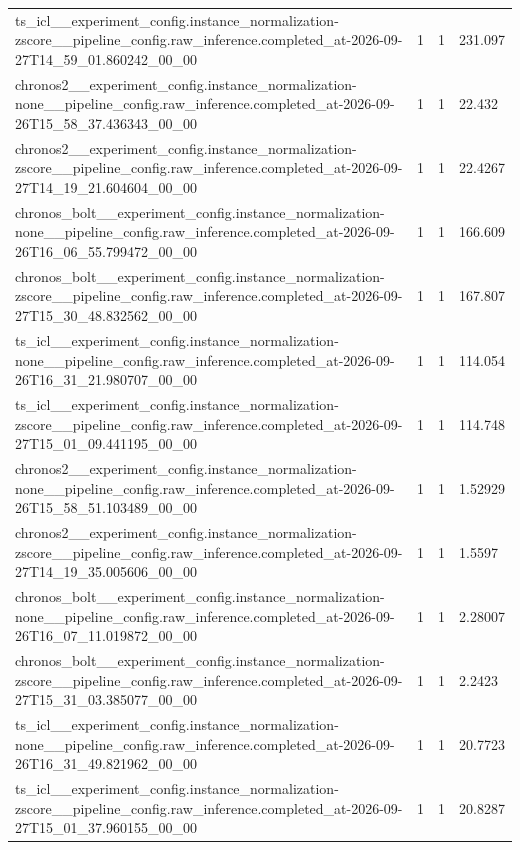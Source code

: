 \begin{tabular}{llll}
ts\_icl\_\_experiment\_config.instance\_normalization-zscore\_\_pipeline\_config.raw\_inference.completed\_at-2026-09-27T14\_59\_01.860242\_00\_00 & 1 & 1 & 231.097 \\
chronos2\_\_experiment\_config.instance\_normalization-none\_\_pipeline\_config.raw\_inference.completed\_at-2026-09-26T15\_58\_37.436343\_00\_00 & 1 & 1 & 22.432 \\
chronos2\_\_experiment\_config.instance\_normalization-zscore\_\_pipeline\_config.raw\_inference.completed\_at-2026-09-27T14\_19\_21.604604\_00\_00 & 1 & 1 & 22.4267 \\
chronos\_bolt\_\_experiment\_config.instance\_normalization-none\_\_pipeline\_config.raw\_inference.completed\_at-2026-09-26T16\_06\_55.799472\_00\_00 & 1 & 1 & 166.609 \\
chronos\_bolt\_\_experiment\_config.instance\_normalization-zscore\_\_pipeline\_config.raw\_inference.completed\_at-2026-09-27T15\_30\_48.832562\_00\_00 & 1 & 1 & 167.807 \\
ts\_icl\_\_experiment\_config.instance\_normalization-none\_\_pipeline\_config.raw\_inference.completed\_at-2026-09-26T16\_31\_21.980707\_00\_00 & 1 & 1 & 114.054 \\
ts\_icl\_\_experiment\_config.instance\_normalization-zscore\_\_pipeline\_config.raw\_inference.completed\_at-2026-09-27T15\_01\_09.441195\_00\_00 & 1 & 1 & 114.748 \\
chronos2\_\_experiment\_config.instance\_normalization-none\_\_pipeline\_config.raw\_inference.completed\_at-2026-09-26T15\_58\_51.103489\_00\_00 & 1 & 1 & 1.52929 \\
chronos2\_\_experiment\_config.instance\_normalization-zscore\_\_pipeline\_config.raw\_inference.completed\_at-2026-09-27T14\_19\_35.005606\_00\_00 & 1 & 1 & 1.5597 \\
chronos\_bolt\_\_experiment\_config.instance\_normalization-none\_\_pipeline\_config.raw\_inference.completed\_at-2026-09-26T16\_07\_11.019872\_00\_00 & 1 & 1 & 2.28007 \\
chronos\_bolt\_\_experiment\_config.instance\_normalization-zscore\_\_pipeline\_config.raw\_inference.completed\_at-2026-09-27T15\_31\_03.385077\_00\_00 & 1 & 1 & 2.2423 \\
ts\_icl\_\_experiment\_config.instance\_normalization-none\_\_pipeline\_config.raw\_inference.completed\_at-2026-09-26T16\_31\_49.821962\_00\_00 & 1 & 1 & 20.7723 \\
ts\_icl\_\_experiment\_config.instance\_normalization-zscore\_\_pipeline\_config.raw\_inference.completed\_at-2026-09-27T15\_01\_37.960155\_00\_00 & 1 & 1 & 20.8287 \\

\end{tabular}
